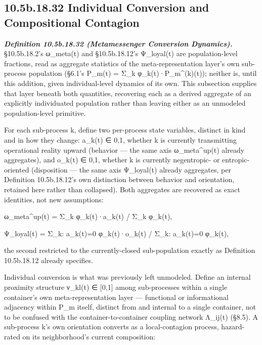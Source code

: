 \documentclass[
]{article}
\begin{document}
\hypertarget{b.18.32-individual-conversion-and-compositional-contagion}{%
\subsection{10.5b.18.32 Individual Conversion and Compositional Contagion}\label{b.18.32-individual-conversion-and-compositional-contagion}}

\emph{\textbf{Definition 10.5b.18.32 (Metamessenger Conversion
Dynamics).}} §10.5b.18.2's ω\_meta(t) and §10.5b.18.12's Ψ\_loyal(t)
are population-level fractions, read as aggregate statistics of the
meta-representation layer's own sub-process population (§6.1's P\_m(t)
= Σ\_k φ\_k(t)·P\_m\^{}(k)(t)); neither is, until this addition, given
individual-level dynamics of its own. This subsection supplies that
layer beneath both quantities, recovering each as a derived aggregate
of an explicitly individuated population rather than leaving either as
an unmodeled population-level primitive.

For each sub-process k, define two per-process state variables,
distinct in kind and in how they change: a\_k(t) ∈ {0,1}, whether k is
currently transmitting operational reality upward (behavior  ---  the
same axis ω\_meta\^{}up(t) already aggregates), and o\_k(t) ∈ {0,1},
whether k is currently negentropic- or entropic-oriented (disposition
---  the same axis Ψ\_loyal(t) already aggregates, per Definition
10.5b.18.12's own distinction between behavior and orientation,
retained here rather than collapsed). Both aggregates are recovered as
exact identities, not new assumptions:

ω\_meta\^{}up(t) = Σ\_k φ\_k(t)·a\_k(t) / Σ\_k φ\_k(t),

Ψ\_loyal(t) = Σ\_{k: a\_k(t)=0} φ\_k(t)·o\_k(t) / Σ\_{k: a\_k(t)=0}
φ\_k(t),

the second restricted to the currently-closed sub-population exactly
as Definition 10.5b.18.12 already specifies.

Individual conversion is what was previously left unmodeled. Define an
internal proximity structure ν\_kl(t) ∈ {[}0,1{]} among sub-processes
within a single container's own meta-representation layer  ---
functional or informational adjacency within P\_m itself, distinct
from and internal to a single container, not to be confused with the
container-to-container coupling network Λ\_ij(t) (§8.5). A sub-process
k's own orientation converts as a local-contagion process,
hazard-rated on its neighborhood's current composition:
\end{document}
